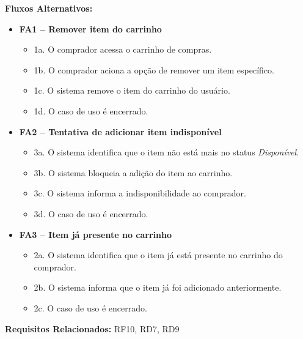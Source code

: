 ﻿\documentclass[12pt,a4paper]{article}
\begin{document}
\vspace{0.5em}
\noindent\textbf{Fluxos Alternativos:}
\begin{itemize}[leftmargin=*]
    \item \textbf{FA1 – Remover item do carrinho}
    \begin{itemize}[label={}, leftmargin=0.5cm]
        \item 1a. O comprador acessa o carrinho de compras.
        \item 1b. O comprador aciona a opção de remover um item específico.
        \item 1c. O sistema remove o item do carrinho do usuário.
        \item 1d. O caso de uso é encerrado.
    \end{itemize}
    
    \item \textbf{FA2 – Tentativa de adicionar item indisponível}
    \begin{itemize}[label={}, leftmargin=0.5cm]
        \item 3a. O sistema identifica que o item não está mais no status \textit{Disponível}.
        \item 3b. O sistema bloqueia a adição do item ao carrinho.
        \item 3c. O sistema informa a indisponibilidade ao comprador.
        \item 3d. O caso de uso é encerrado.
    \end{itemize}

    \item \textbf{FA3 – Item já presente no carrinho}
    \begin{itemize}[label={}, leftmargin=0.5cm]
        \item 2a. O sistema identifica que o item já está presente no carrinho do comprador.
        \item 2b. O sistema informa que o item já foi adicionado anteriormente.
        \item 2c. O caso de uso é encerrado.
    \end{itemize}
\end{itemize}

\vspace{0.5em}
\noindent\textbf{Requisitos Relacionados:} RF10, RD7, RD9

\end{document}
